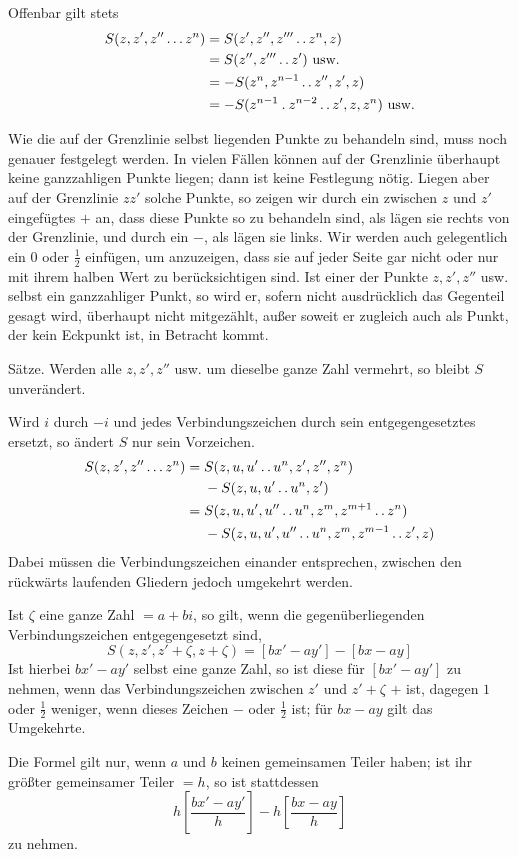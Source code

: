Offenbar gilt stets
\[
\begin{aligned}
S(z,z',z''\ldots z^n)&=S(z',z'',z'''\mathinner{.\,.} z^n,z)\\
&=S(z'',z'''\mathinner{.\,.} z')\text{ usw.}\\
&=-S(z^n,z^{n-1}\mathinner{.\,.} z'',z',z)\\
&=-S(z^{n-1}\mathbin{.} z^{n-2}\mathinner{.\,.} z',z,z^n)\text{ usw.}
\end{aligned}
\]

Wie die auf der Grenzlinie selbst liegenden Punkte zu behandeln sind, muss noch genauer festgelegt werden. In vielen Fällen können auf der Grenzlinie überhaupt keine ganzzahligen Punkte liegen; dann ist keine Festlegung nötig. Liegen aber auf der Grenzlinie $zz'$ solche Punkte, so zeigen wir durch ein zwischen $z$ und $z'$ eingefügtes $+$ an, dass diese Punkte so zu behandeln sind, als lägen sie rechts von der Grenzlinie, und durch ein $-$, als lägen sie links. Wir werden auch gelegentlich ein $0$ oder $\frac12$ einfügen, um anzuzeigen, dass sie auf
jeder Seite gar nicht oder nur mit ihrem halben Wert zu berücksichtigen sind. Ist einer der Punkte $z,z',z''$ usw. selbst ein ganzzahliger Punkt, so wird er, sofern nicht ausdrücklich das Gegenteil gesagt wird, überhaupt nicht mitgezählt, außer soweit er zugleich auch als Punkt, der kein Eckpunkt ist, in Betracht kommt.

Sätze. Werden alle $z,z',z''$ usw. um dieselbe ganze Zahl vermehrt, so bleibt $S$ unverändert.

Wird $i$ durch $-i$ und jedes Verbindungszeichen durch sein entgegengesetztes ersetzt, so ändert $S$ nur sein Vorzeichen.
\[
\begin{aligned}
S(z,z',z''\ldots z^n)={}&S(z,u,u'\mathinner{.\,.} u^n,z',z'',z^n)\\
&-S(z,u,u'\mathinner{.\,.} u^n,z')\\
={}&S(z,u,u',u''\mathinner{.\,.} u^n,z^m,z^{m+1}\mathinner{.\,.} z^n)\\
&-S(z,u,u',u''\mathinner{.\,.} u^n,z^m,z^{m-1}\mathinner{.\,.} z',z)
\end{aligned}
\]
Dabei müssen die Verbindungszeichen einander entsprechen, zwischen den rückwärts laufenden Gliedern jedoch umgekehrt werden.

Ist $\zeta$ eine ganze Zahl $=a+bi$, so gilt, wenn die gegenüberliegenden Verbindungszeichen entgegengesetzt sind,
\[
S(z,z',z'+\zeta,z+\zeta)=[bx'-ay']-[bx-ay]
\]
Ist hierbei $bx'-ay'$ selbst eine ganze Zahl, so ist diese für $[bx'-ay']$ zu nehmen, wenn das Verbindungszeichen zwischen $z'$ und $z'+\zeta$ $+$ ist, dagegen $1$ oder $\frac12$ weniger, wenn dieses Zeichen $-$ oder $\frac12$ ist; für $bx-ay$ gilt das Umgekehrte.

Die Formel gilt nur, wenn $a$ und $b$ keinen gemeinsamen Teiler haben; ist ihr größter gemeinsamer Teiler $=h$, so ist stattdessen
\[
h\left[\frac{bx'-ay'}h\right]-h\left[\frac{bx-ay}h\right]
\]
zu nehmen.
